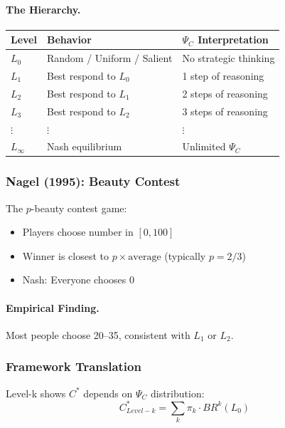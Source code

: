 \paragraph{The Hierarchy.}
\begin{center}
\renewcommand{\arraystretch}{1.3}
\begin{tabular}{|l|l|l|}
\hline
\textbf{Level} & \textbf{Behavior} & \textbf{$\Psi_C$ Interpretation} \\
\hline
$L_0$ & Random / Uniform / Salient & No strategic thinking \\
$L_1$ & Best respond to $L_0$ & 1 step of reasoning \\
$L_2$ & Best respond to $L_1$ & 2 steps of reasoning \\
$L_3$ & Best respond to $L_2$ & 3 steps of reasoning \\
$\vdots$ & $\vdots$ & $\vdots$ \\
$L_\infty$ & Nash equilibrium & Unlimited $\Psi_C$ \\
\hline
\end{tabular}
\end{center}

\subsubsection{Nagel (1995): Beauty Contest}

The $p$-beauty contest game:
\begin{itemize}
    \item Players choose number in $[0, 100]$
    \item Winner is closest to $p \times \text{average}$ (typically $p = 2/3$)
    \item Nash: Everyone chooses 0
\end{itemize}

\paragraph{Empirical Finding.}
Most people choose 20--35, consistent with $L_1$ or $L_2$.

\subsubsection{Framework Translation}

Level-k shows $C^*$ depends on $\Psi_C$ distribution:
\begin{equation}
\boxed{
C^*_{Level-k} = \sum_k \pi_k \cdot BR^k(L_0)
}
\label{eq:levelk-equilibrium}
\end{equation}

